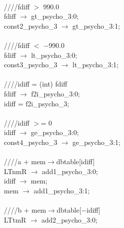    \\
   \hspace*{2em}////fdiff $>$ 990.0 \\
   \hspace*{2em}fdiff $\rightarrow$ gt\_psycho\_3:0; \\
   \hspace*{2em}const2\_psycho\_3 $\rightarrow$ gt\_psycho\_3:1; \\
   \\
   \hspace*{2em}////fdiff $<$ $-$990.0 \\
   \hspace*{2em}fdiff $\rightarrow$ lt\_psycho\_3:0; \\
   \hspace*{2em}const3\_psycho\_3 $\rightarrow$ lt\_psycho\_3:1; \\
   \\
   \hspace*{2em}////idiff = (int) fdiff \\
   \hspace*{2em}fdiff $\rightarrow$ f2i\_psycho\_3:0; \\
   \hspace*{2em}idiff = f2i\_psycho\_3; \\
   \\
   \hspace*{2em}////idiff $>$= 0 \\
   \hspace*{2em}idiff $\rightarrow$ ge\_psycho\_3:0; \\
   \hspace*{2em}const4\_psycho\_3 $\rightarrow$ ge\_psycho\_3:1; \\
   \\
   \hspace*{2em}////a + mem$\rightarrow$dbtable[idiff] \\
   \hspace*{2em}LTnmR $\rightarrow$ add1\_psycho\_3:0; \\
   \hspace*{2em}idiff $\rightarrow$ mem; \\
   \hspace*{2em}mem $\rightarrow$ add1\_psycho\_3:1; \\
   \\
   \hspace*{2em}////b + mem$\rightarrow$dbtable[$-$idiff] \\
   \hspace*{2em}LTtmR $\rightarrow$ add2\_psycho\_3:0; \\
